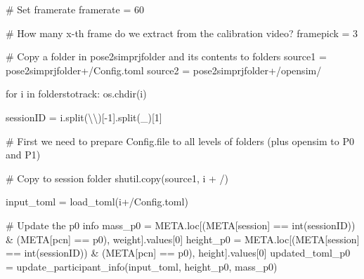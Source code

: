 \documentclass[
  letterpaper,
  DIV=11,
  numbers=noendperiod]{scrreprt}
\newenvironment{Shaded}{\begin{snugshade}}{\end{snugshade}}
\newcommand{\BuiltInTok}[1]{\textcolor[rgb]{0.00,0.23,0.31}{#1}}
\newcommand{\CharTok}[1]{\textcolor[rgb]{0.13,0.47,0.30}{#1}}
\newcommand{\CommentTok}[1]{\textcolor[rgb]{0.37,0.37,0.37}{#1}}
\newcommand{\ControlFlowTok}[1]{\textcolor[rgb]{0.00,0.23,0.31}{#1}}
\newcommand{\DecValTok}[1]{\textcolor[rgb]{0.68,0.00,0.00}{#1}}
\newcommand{\KeywordTok}[1]{\textcolor[rgb]{0.00,0.23,0.31}{#1}}
\newcommand{\NormalTok}[1]{\textcolor[rgb]{0.00,0.23,0.31}{#1}}
\newcommand{\OperatorTok}[1]{\textcolor[rgb]{0.37,0.37,0.37}{#1}}
\newcommand{\StringTok}[1]{\textcolor[rgb]{0.13,0.47,0.30}{#1}}
\begin{document}
\begin{Shaded}
\begin{Highlighting}[]
\CommentTok{\# Set framerate}
\NormalTok{framerate }\OperatorTok{=} \DecValTok{60}

\CommentTok{\# How many x{-}th frame do we extract from the calibration video? }
\NormalTok{framepick }\OperatorTok{=} \DecValTok{3}

\CommentTok{\# Copy a folder in pose2simprjfolder and its contents to folders}
\NormalTok{source1 }\OperatorTok{=}\NormalTok{ pose2simprjfolder}\OperatorTok{+}\StringTok{\textquotesingle{}/Config.toml\textquotesingle{}}
\NormalTok{source2 }\OperatorTok{=}\NormalTok{ pose2simprjfolder}\OperatorTok{+}\StringTok{\textquotesingle{}/opensim/\textquotesingle{}}


\ControlFlowTok{for}\NormalTok{ i }\KeywordTok{in}\NormalTok{ folderstotrack:}
\NormalTok{    os.chdir(i)}

\NormalTok{    sessionID }\OperatorTok{=}\NormalTok{ i.split(}\StringTok{\textquotesingle{}}\CharTok{\textbackslash{}\textbackslash{}}\StringTok{\textquotesingle{}}\NormalTok{)[}\OperatorTok{{-}}\DecValTok{1}\NormalTok{].split(}\StringTok{\textquotesingle{}\_\textquotesingle{}}\NormalTok{)[}\DecValTok{1}\NormalTok{]}

    \CommentTok{\# First we need to prepare Config.file to all levels of folders (plus opensim to P0 and P1)}

    \CommentTok{\# Copy to session folder}
\NormalTok{    shutil.copy(source1, i }\OperatorTok{+} \StringTok{\textquotesingle{}/\textquotesingle{}}\NormalTok{)}

\NormalTok{    input\_toml }\OperatorTok{=}\NormalTok{ load\_toml(i}\OperatorTok{+}\StringTok{\textquotesingle{}/Config.toml\textquotesingle{}}\NormalTok{)}

    \CommentTok{\# Update the p0 info}
\NormalTok{    mass\_p0 }\OperatorTok{=}\NormalTok{ META.loc[(META[}\StringTok{\textquotesingle{}session\textquotesingle{}}\NormalTok{] }\OperatorTok{==} \BuiltInTok{int}\NormalTok{(sessionID)) }\OperatorTok{\&}\NormalTok{ (META[}\StringTok{\textquotesingle{}pcn\textquotesingle{}}\NormalTok{] }\OperatorTok{==} \StringTok{\textquotesingle{}p0\textquotesingle{}}\NormalTok{), }\StringTok{\textquotesingle{}weight\textquotesingle{}}\NormalTok{].values[}\DecValTok{0}\NormalTok{]}
\NormalTok{    height\_p0 }\OperatorTok{=}\NormalTok{ META.loc[(META[}\StringTok{\textquotesingle{}session\textquotesingle{}}\NormalTok{] }\OperatorTok{==} \BuiltInTok{int}\NormalTok{(sessionID)) }\OperatorTok{\&}\NormalTok{ (META[}\StringTok{\textquotesingle{}pcn\textquotesingle{}}\NormalTok{] }\OperatorTok{==} \StringTok{\textquotesingle{}p0\textquotesingle{}}\NormalTok{), }\StringTok{\textquotesingle{}height\textquotesingle{}}\NormalTok{].values[}\DecValTok{0}\NormalTok{]}
\NormalTok{    updated\_toml\_p0 }\OperatorTok{=}\NormalTok{ update\_participant\_info(input\_toml, height\_p0, mass\_p0)}


\end{Highlighting}
\end{Shaded}
\end{document}

